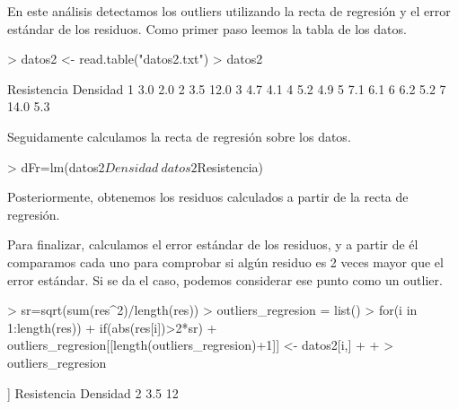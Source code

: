 \documentclass [a4paper] {article}
\begin{document}
En este análisis detectamos los outliers utilizando la recta de regresión y
el error estándar de los residuos. Como primer paso leemos la tabla de los datos.
\begin{Schunk}
\begin{Sinput}
> datos2 <- read.table("datos2.txt")
> datos2
\end{Sinput}
\begin{Soutput}
  Resistencia Densidad
1         3.0      2.0
2         3.5     12.0
3         4.7      4.1
4         5.2      4.9
5         7.1      6.1
6         6.2      5.2
7        14.0      5.3
\end{Soutput}
\end{Schunk}
Seguidamente calculamos la recta de regresión sobre los datos.
\begin{Schunk}
\begin{Sinput}
> dFr=lm(datos2$Densidad~datos2$Resistencia)
\end{Sinput}
\end{Schunk}
Posteriormente, obtenemos los residuos calculados a partir de la recta de regresión.
\begin{Schunk}
\end{Schunk}
Para finalizar, calculamos el error estándar de los residuos, y a partir de él comparamos cada
uno para comprobar si algún residuo es 2 veces mayor que el error estándar. Si se da el caso, 
podemos considerar ese punto como un outlier. 
\begin{Schunk}
\begin{Sinput}
> sr=sqrt(sum(res^2)/length(res))
> outliers_regresion = list()
> for(i in 1:length(res)){
+   if(abs(res[i])>2*sr){
+     outliers_regresion[[length(outliers_regresion)+1]] <- datos2[i,]
+   }
+ }
> outliers_regresion
\end{Sinput}
\begin{Soutput}
[[1]]
  Resistencia Densidad
2         3.5       12
\end{Soutput}
\end{Schunk}
\end{document}
